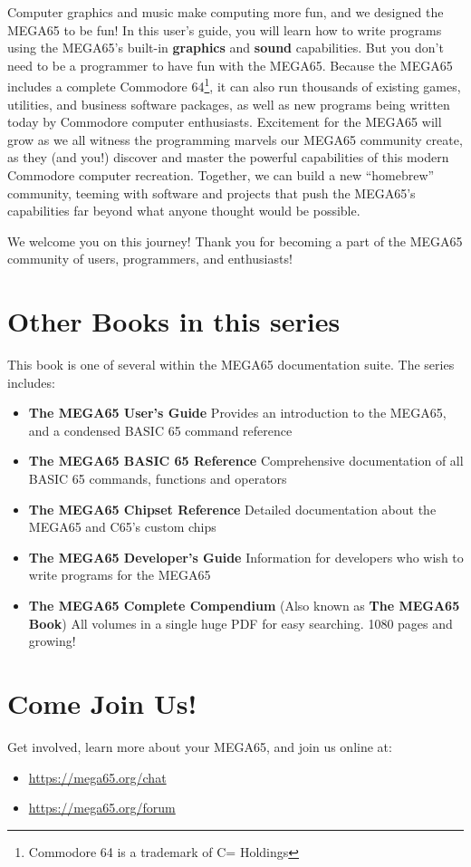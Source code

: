 Computer graphics and music make computing more fun, and we designed the MEGA65 to be fun! In this user's guide, you will learn how to write programs using the MEGA65's built-in {\bf graphics} and {\bf sound} capabilities. But you don't need to be a programmer to have fun with the MEGA65. Because the MEGA65 includes a complete Commodore{\textregistered} 64{\texttrademark}\footnote{Commodore 64 is a trademark of C= Holdings}, it can also run thousands of existing games, utilities, and business software packages, as well as new programs being written today by Commodore computer enthusiasts. Excitement for the MEGA65 will grow as we all witness the programming marvels our MEGA65 community create, as they (and you!) discover and master the powerful capabilities of this modern Commodore computer recreation. Together, we can build a new ``homebrew'' community, teeming with software and projects that push the MEGA65's capabilities far beyond what anyone thought would be possible.

We welcome you on this journey! Thank you for becoming a part of the MEGA65
community of users, programmers, and enthusiasts!

\section{Other Books in this series}

This book is one of several within the MEGA65 documentation suite. The series includes:

\begin{itemize}
  \item {\bf The MEGA65 User's Guide} \newline
      Provides an introduction to the MEGA65, and a condensed BASIC 65 command reference
    \item {\bf The MEGA65 BASIC 65 Reference} \newline
      Comprehensive documentation of all BASIC 65 commands, functions and operators
    \item {\bf The MEGA65 Chipset Reference} \newline
      Detailed documentation about the MEGA65 and C65's custom chips
    \item {\bf The MEGA65 Developer's Guide} \newline
      Information for developers who wish to write programs for the MEGA65
    \item {\bf The MEGA65 Complete Compendium} \newline
      (Also known as {\bf The MEGA65 Book}) \newline
      All volumes in a single huge PDF for easy searching. 1080 pages and growing!
\end{itemize}

\section{Come Join Us!}
Get involved, learn more about your MEGA65, and join us online at:

\begin{itemize}
    \item \url{https://mega65.org/chat}
    \item \url{https://mega65.org/forum}
\end{itemize}
